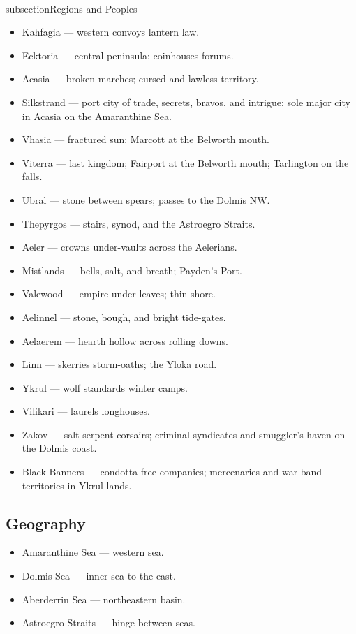 \\subsection{Regions and Peoples}
\begin{itemize}
\item Kahfagia --- western convoys lantern law.
\item Ecktoria --- central peninsula; coinhouses forums.
\item Acasia --- broken marches; cursed and lawless territory.
\item Silkstrand --- port city of trade, secrets, bravos, and intrigue; sole major city in Acasia on the Amaranthine Sea.
\item Vhasia --- fractured sun; Marcott at the Belworth mouth.
\item Viterra --- last kingdom; Fairport at the Belworth mouth; Tarlington on the falls.
\item Ubral --- stone between spears; passes to the Dolmis NW.
\item Thepyrgos --- stairs, synod, and the Astroegro Straits.
\item Aeler --- crowns under-vaults across the Aelerians.
\item Mistlands --- bells, salt, and breath; Payden's Port.
\item Valewood --- empire under leaves; thin shore.
\item Aelinnel --- stone, bough, and bright tide-gates.
\item Aelaerem --- hearth hollow across rolling downs.
\item Linn --- skerries storm-oaths; the Yloka road.
\item Ykrul --- wolf standards winter camps.
\item Vilikari --- laurels longhouses.
\item Zakov --- salt serpent corsairs; criminal syndicates and smuggler's haven on the Dolmis coast.
\item Black Banners --- condotta free companies; mercenaries and war-band territories in Ykrul lands.
\end{itemize}


\subsection{Geography}
\begin{itemize}
\item Amaranthine Sea --- western sea.
\item Dolmis Sea --- inner sea to the east.
\item Aberderrin Sea --- northeastern basin.
\item Astroegro Straits --- hinge between seas.
\end{itemize}

